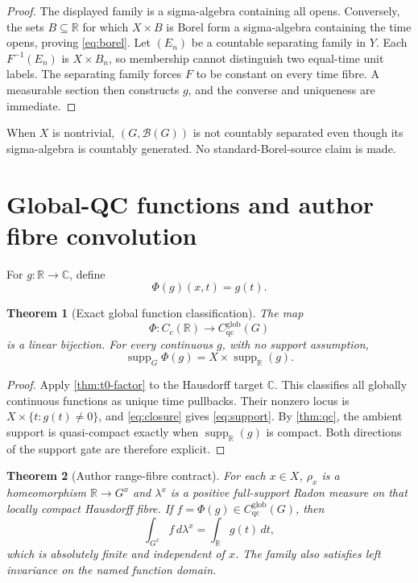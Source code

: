 \documentclass[11pt]{article}
\newtheorem{theorem}{Theorem}[section]
\theoremstyle{definition}
\newcommand{\Borel}{\mathcal B}
\newcommand{\C}{\mathbb C}
\newcommand{\R}{\mathbb R}
\newcommand{\Cglob}{C_{\mathrm{qc}}^{\mathrm{glob}}}
\newcommand{\supp}{\operatorname{supp}}
\begin{document}
\begin{proof}
The displayed family is a sigma-algebra containing all opens.  Conversely,
the sets $B\subseteq\R$ for which $X\times B$ is Borel form a sigma-algebra
containing the time opens, proving \cref{eq:borel}.  Let $(E_n)$ be a
countable separating family in $Y$.  Each $F^{-1}(E_n)$ is $X\times B_n$,
so membership cannot distinguish two equal-time unit labels.  The separating
family forces $F$ to be constant on every time fibre.  A measurable section
then constructs $g$, and the converse and uniqueness are immediate.
\end{proof}

When $X$ is nontrivial, $(G,\Borel(G))$ is not countably separated even
though its sigma-algebra is countably generated.  No standard-Borel-source
claim is made.

\section{Global-QC functions and author fibre convolution}
\label{sec:convolution}

For $g:\R\to\C$, define
\[
 \Phi(g)(x,t)=g(t).
\]

\begin{theorem}[Exact global function classification]
\label{thm:phi}
The map
\[
 \Phi:C_c(\R)\longrightarrow\Cglob(G)
\]
is a linear bijection.  For every continuous $g$, with no support assumption,
\begin{equation}
 \supp_G\Phi(g)=X\times\supp_{\R}(g).
 \label{eq:support}
\end{equation}
\end{theorem}

\begin{proof}
Apply \cref{thm:t0-factor} to the Hausdorff target $\C$.  This classifies all
globally continuous functions as unique time pullbacks.  Their nonzero
locus is $X\times\{t:g(t)\ne0\}$, and \cref{eq:closure} gives
\cref{eq:support}.  By \cref{thm:qc}, the ambient support is quasi-compact
exactly when $\supp_{\R}(g)$ is compact.  Both directions of the support gate
are therefore explicit.
\end{proof}

\begin{theorem}[Author range-fibre contract]
\label{thm:fibres}
For each $x\in X$, $\rho_x$ is a homeomorphism $\R\to G^x$ and $\lambda^x$
is a positive full-support Radon measure on that locally compact Hausdorff
fibre.  If $f=\Phi(g)\in\Cglob(G)$, then
\begin{equation}
 \int_{G^x}f\,d\lambda^x=\int_{\R} g(t)\,dt,
 \label{eq:fibre-integral}
\end{equation}
which is absolutely finite and independent of $x$.  The family also
satisfies left invariance on the named function domain.
\end{theorem}
\end{document}
